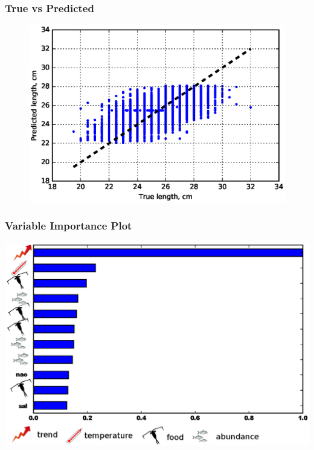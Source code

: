 \documentclass{beamer}
\begin{document}

\begin{frame}
    \frametitle{True vs Predicted}
\begin{figure}
    \centering
\includegraphics[scale=0.75]{../fig/true-pred-present}
\end{figure}
\end{frame}



\begin{frame}
    \frametitle{Variable Importance Plot}
\includegraphics[scale=0.55]{../fig/featureCS-present}
\end{frame}
\end{document}
